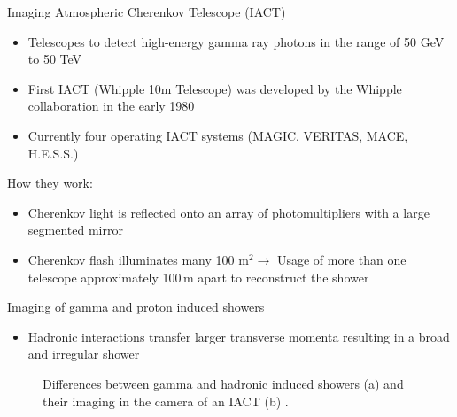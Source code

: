 \documentclass[aspectratio=1610, 10pt]{beamer}
\begin{document}
\begin{frame}{Imaging Atmospheric Cherenkov Telescope (IACT)}
  \begin{itemize}
    \item Telescopes to detect high-energy gamma ray photons in the range of 50 GeV to 50 TeV
    \medskip
    \item First IACT (Whipple 10m Telescope) was developed by the Whipple collaboration in the early 1980
    \medskip
    \item Currently four operating IACT systems (MAGIC, VERITAS, MACE, H.E.S.S.)
  \end{itemize}
\vspace{0.5cm}
How they work:
\begin{itemize}
  \item Cherenkov light is reflected onto an array of photomultipliers with a large segmented mirror
  \medskip
  \item Cherenkov flash illuminates many 100 $\mathrm{m}^2 \rightarrow$ Usage of more than one telescope approximately 100$\, \mathrm{m}$ apart to
  reconstruct the shower
\end{itemize}
\end{frame}

\begin{frame}{Imaging of gamma and proton induced showers}
  \begin{itemize}
    \item Hadronic interactions transfer larger transverse momenta resulting in a broad and irregular shower
  \end{itemize}
  \begin{figure}
      \hspace{0.5cm}
      \caption{Differences between gamma and hadronic induced showers (a)  and their imaging in the camera of an IACT (b) \cite{iact}.}
  \end{figure}
\end{frame}
\end{document}
